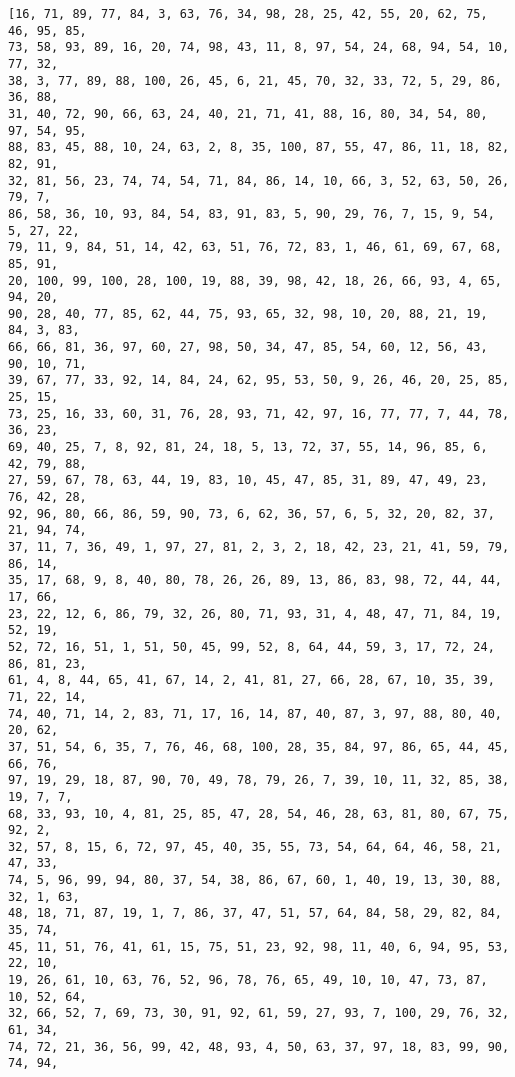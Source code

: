 \documentclass[11pt]{article}
\begin{document}
    \begin{Verbatim}[commandchars=\\\{\}]
[16, 71, 89, 77, 84, 3, 63, 76, 34, 98, 28, 25, 42, 55, 20, 62, 75, 46, 95, 85,
73, 58, 93, 89, 16, 20, 74, 98, 43, 11, 8, 97, 54, 24, 68, 94, 54, 10, 77, 32,
38, 3, 77, 89, 88, 100, 26, 45, 6, 21, 45, 70, 32, 33, 72, 5, 29, 86, 36, 88,
31, 40, 72, 90, 66, 63, 24, 40, 21, 71, 41, 88, 16, 80, 34, 54, 80, 97, 54, 95,
88, 83, 45, 88, 10, 24, 63, 2, 8, 35, 100, 87, 55, 47, 86, 11, 18, 82, 82, 91,
32, 81, 56, 23, 74, 74, 54, 71, 84, 86, 14, 10, 66, 3, 52, 63, 50, 26, 79, 7,
86, 58, 36, 10, 93, 84, 54, 83, 91, 83, 5, 90, 29, 76, 7, 15, 9, 54, 5, 27, 22,
79, 11, 9, 84, 51, 14, 42, 63, 51, 76, 72, 83, 1, 46, 61, 69, 67, 68, 85, 91,
20, 100, 99, 100, 28, 100, 19, 88, 39, 98, 42, 18, 26, 66, 93, 4, 65, 94, 20,
90, 28, 40, 77, 85, 62, 44, 75, 93, 65, 32, 98, 10, 20, 88, 21, 19, 84, 3, 83,
66, 66, 81, 36, 97, 60, 27, 98, 50, 34, 47, 85, 54, 60, 12, 56, 43, 90, 10, 71,
39, 67, 77, 33, 92, 14, 84, 24, 62, 95, 53, 50, 9, 26, 46, 20, 25, 85, 25, 15,
73, 25, 16, 33, 60, 31, 76, 28, 93, 71, 42, 97, 16, 77, 77, 7, 44, 78, 36, 23,
69, 40, 25, 7, 8, 92, 81, 24, 18, 5, 13, 72, 37, 55, 14, 96, 85, 6, 42, 79, 88,
27, 59, 67, 78, 63, 44, 19, 83, 10, 45, 47, 85, 31, 89, 47, 49, 23, 76, 42, 28,
92, 96, 80, 66, 86, 59, 90, 73, 6, 62, 36, 57, 6, 5, 32, 20, 82, 37, 21, 94, 74,
37, 11, 7, 36, 49, 1, 97, 27, 81, 2, 3, 2, 18, 42, 23, 21, 41, 59, 79, 86, 14,
35, 17, 68, 9, 8, 40, 80, 78, 26, 26, 89, 13, 86, 83, 98, 72, 44, 44, 17, 66,
23, 22, 12, 6, 86, 79, 32, 26, 80, 71, 93, 31, 4, 48, 47, 71, 84, 19, 52, 19,
52, 72, 16, 51, 1, 51, 50, 45, 99, 52, 8, 64, 44, 59, 3, 17, 72, 24, 86, 81, 23,
61, 4, 8, 44, 65, 41, 67, 14, 2, 41, 81, 27, 66, 28, 67, 10, 35, 39, 71, 22, 14,
74, 40, 71, 14, 2, 83, 71, 17, 16, 14, 87, 40, 87, 3, 97, 88, 80, 40, 20, 62,
37, 51, 54, 6, 35, 7, 76, 46, 68, 100, 28, 35, 84, 97, 86, 65, 44, 45, 66, 76,
97, 19, 29, 18, 87, 90, 70, 49, 78, 79, 26, 7, 39, 10, 11, 32, 85, 38, 19, 7, 7,
68, 33, 93, 10, 4, 81, 25, 85, 47, 28, 54, 46, 28, 63, 81, 80, 67, 75, 92, 2,
32, 57, 8, 15, 6, 72, 97, 45, 40, 35, 55, 73, 54, 64, 64, 46, 58, 21, 47, 33,
74, 5, 96, 99, 94, 80, 37, 54, 38, 86, 67, 60, 1, 40, 19, 13, 30, 88, 32, 1, 63,
48, 18, 71, 87, 19, 1, 7, 86, 37, 47, 51, 57, 64, 84, 58, 29, 82, 84, 35, 74,
45, 11, 51, 76, 41, 61, 15, 75, 51, 23, 92, 98, 11, 40, 6, 94, 95, 53, 22, 10,
19, 26, 61, 10, 63, 76, 52, 96, 78, 76, 65, 49, 10, 10, 47, 73, 87, 10, 52, 64,
32, 66, 52, 7, 69, 73, 30, 91, 92, 61, 59, 27, 93, 7, 100, 29, 76, 32, 61, 34,
74, 72, 21, 36, 56, 99, 42, 48, 93, 4, 50, 63, 37, 97, 18, 83, 99, 90, 74, 94,

\end{Verbatim}
\end{document}
